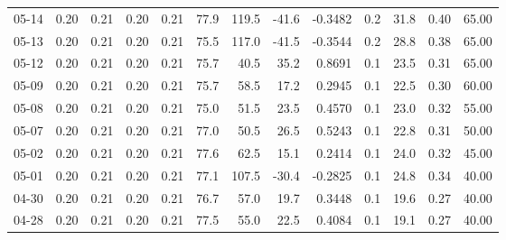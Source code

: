\begin{threeparttable}
{\begin{tabular}{lrrrrrrrrrrrr}
  05-14 &          0.20 &          0.21 &          0.20 &        0.21 &                77.9 &               119.5 &      -41.6 &      -0.3482 &                 0.2 &             31.8 &            0.40 &                  65.00 \\
  05-13 &          0.20 &          0.21 &          0.20 &        0.21 &                75.5 &               117.0 &      -41.5 &      -0.3544 &                 0.2 &             28.8 &            0.38 &                  65.00 \\
  05-12 &          0.20 &          0.21 &          0.20 &        0.21 &                75.7 &                40.5 &       35.2 &       0.8691 &                 0.1 &             23.5 &            0.31 &                  65.00 \\
  05-09 &          0.20 &          0.21 &          0.20 &        0.21 &                75.7 &                58.5 &       17.2 &       0.2945 &                 0.1 &             22.5 &            0.30 &                  60.00 \\
  05-08 &          0.20 &          0.21 &          0.20 &        0.21 &                75.0 &                51.5 &       23.5 &       0.4570 &                 0.1 &             23.0 &            0.32 &                  55.00 \\
  05-07 &          0.20 &          0.21 &          0.20 &        0.21 &                77.0 &                50.5 &       26.5 &       0.5243 &                 0.1 &             22.8 &            0.31 &                  50.00 \\
  05-02 &          0.20 &          0.21 &          0.20 &        0.21 &                77.6 &                62.5 &       15.1 &       0.2414 &                 0.1 &             24.0 &            0.32 &                  45.00 \\
  05-01 &          0.20 &          0.21 &          0.20 &        0.21 &                77.1 &               107.5 &      -30.4 &      -0.2825 &                 0.1 &             24.8 &            0.34 &                  40.00 \\
  04-30 &          0.20 &          0.21 &          0.20 &        0.21 &                76.7 &                57.0 &       19.7 &       0.3448 &                 0.1 &             19.6 &            0.27 &                  40.00 \\
  04-28 &          0.20 &          0.21 &          0.20 &        0.21 &                77.5 &                55.0 &       22.5 &       0.4084 &                 0.1 &             19.1 &            0.27 &                  40.00 \\

\end{tabular}}
\end{threeparttable}
